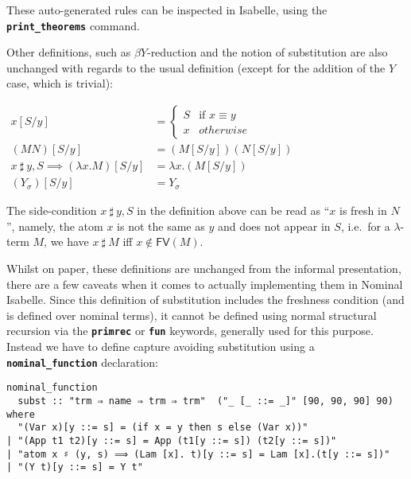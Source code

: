 \documentclass[a4paper, 12pt, twoside]{style/ociamthesis}
\theoremstyle{plain}
\theoremstyle{definition}
\newtheorem{Definition}{Definition}[chapter]
\theoremstyle{remark}
\newtheorem*{Note}{Note}
\newcommand{\fv}{\textsf{FV}}
\renewenvironment{Note}{\begin{OldNote}\begin{mdframed}[style=example, linecolor=black]}{\end{mdframed}\end{OldNote}}
\renewenvironment{Definition}{\begin{OldDefinition}\begin{mdframed}[style=example, linecolor=cyan]}{\end{mdframed}\end{OldDefinition}}
\begin{document}
\(\ \)

\begin{Note}

These auto-generated rules can be inspected in Isabelle, using the
\textbf{\texttt{print\_theorems}} command.

\end{Note}

Other definitions, such as \(\beta Y\)-reduction and the notion of
substitution are also unchanged with regards to the usual definition
(except for the addition of the \(Y\) case, which is trivial):

\begin{Definition}[Capture-avoiding substitution]

\begin{center}
$\begin{aligned}
x[S/y] &= \begin{cases}
S & \text{if }x \equiv y\\
x & otherwise
\end{cases}\\
(MN)[S/y] &= (M[S/y])(N[S/y])\\
x\ \sharp\ y , S \implies (\lambda x.M)[S/y] &= \lambda x.(M[S/y])\\
(Y_\sigma)[S/y] &= Y_\sigma
\end{aligned}$
\end{center}

\end{Definition}

The side-condition \(x\ \sharp\ y , S\) in the definition above can be
read as ``\(x\) is fresh in \(N\)'', namely, the atom \(x\) is not the
same as \(y\) and does not appear in \(S\), i.e.~for a \(\lambda\)-term
\(M\), we have \(x\ \sharp\ M\) iff \(x \not\in \fv(M)\).

Whilst on paper, these definitions are unchanged from the informal
presentation, there are a few caveats when it comes to actually
implementing them in Nominal Isabelle. Since this definition of
substitution includes the freshness condition (and is defined over
nominal terms), it cannot be defined using normal structural recursion
via the \textbf{\texttt{primrec}} or \textbf{\texttt{fun}} keywords,
generally used for this purpose. Instead we have to define capture
avoiding substitution using a \textbf{\texttt{nominal\_function}}
declaration:

\begin{verbatim}
nominal_function
  subst :: "trm ⇒ name ⇒ trm ⇒ trm"  ("_ [_ ::= _]" [90, 90, 90] 90)
where
  "(Var x)[y ::= s] = (if x = y then s else (Var x))"
| "(App t1 t2)[y ::= s] = App (t1[y ::= s]) (t2[y ::= s])"
| "atom x ♯ (y, s) ⟹ (Lam [x]. t)[y ::= s] = Lam [x].(t[y ::= s])"
| "(Y t)[y ::= s] = Y t"
\end{verbatim}
\end{document}
